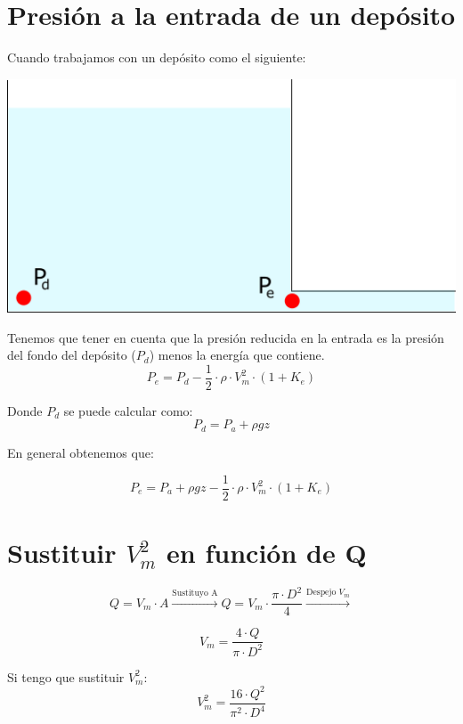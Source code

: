 \documentclass[10pt,a4paper]{article}
\begin{document}
\section{Presión a la entrada de un depósito}
Cuando trabajamos con un depósito como el siguiente:
\begin{center}
    \includegraphics[scale = 0.6]{Deposito.png}
\end{center}

Tenemos que tener en cuenta que la presión reducida en la entrada es la presión del fondo del depósito ($P_d$) menos la energía que contiene.
$$
P_e = P_d - \frac{1}{2} \cdot \rho \cdot V_m^2 \cdot \left( 1 + K_e \right)
$$

Donde $P_d$ se puede calcular como:
$$
P_d = P_a + \rho g z
$$

En general obtenemos que:

\begin{center}
    \begin{tcolorbox}[colback=yellow!40!white, colframe=red!50!black, width=9cm,title=Presión a la entrada de un depósito]
    $$
        P_e = P_a + \rho g z - \frac{1}{2} \cdot \rho \cdot V_m^2 \cdot \left( 1 + K_e \right)
    $$
    \end{tcolorbox}
\end{center}

\section{Sustituir $V_m^2$ en función de Q}
$$
Q = V_m \cdot A \xrightarrow{\text{Sustituyo A}} Q = V_m \cdot \frac{\pi \cdot D^2}{4} \xrightarrow{\text{Despejo $V_m$}} 
$$

$$
V_m = \frac{4 \cdot Q}{\pi \cdot D^2} 
$$

Si tengo que sustituir $V_m^2$:
$$
V_m^2 = \frac{16 \cdot Q^2}{\pi^2 \cdot D^4}
$$
\end{document}
